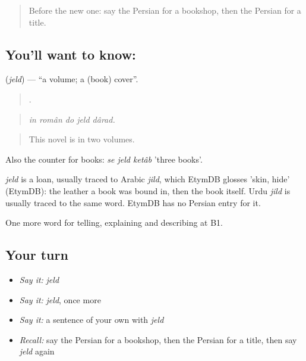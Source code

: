\begin{quote}
Before the new one: say the Persian for a bookshop, then the Persian for a title.
\end{quote}

\subsection*{You'll want to know: }
\textbf{} (\emph{jeld}) — \textquotedblleft{}a volume; a (book) cover\textquotedblright{}.

\begin{quote}
    .
\end{quote}

\begin{quote}
\emph{in român do jeld dârad.}
\end{quote}

\begin{quote}
This novel is in two volumes.
\end{quote}

Also the counter for books: \emph{se jeld ketâb} 'three books'.

\begin{cousinweb}
\emph{jeld} is a loan, usually traced to Arabic \emph{jild}, which EtymDB glosses 'skin, hide' (EtymDB): the leather a book was bound in, then the book itself. Urdu \emph{jild} is usually traced to the same word. EtymDB has no Persian entry for it.
\end{cousinweb}

\begin{grammarlens}[title={What you've built}]
One more word for telling, explaining and describing at B1.
\end{grammarlens}

\subsection*{Your turn}
\begin{itemize}
\raggedright
  \item \emph{Say it:} \emph{jeld}
  \item \emph{Say it:} \emph{jeld}, once more
  \item \emph{Say it:} a sentence of your own with \emph{jeld}
  \item \emph{Recall:} say the Persian for a bookshop, then the Persian for a title, then say \emph{jeld} again
\end{itemize}

